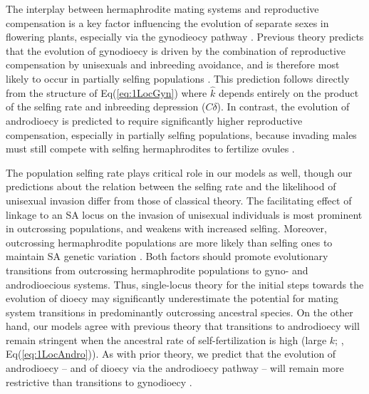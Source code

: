 \documentclass{article}
\begin{document}
The interplay between hermaphrodite mating systems and reproductive compensation is a key factor influencing the evolution of separate sexes in flowering plants, especially via the gynodieocy pathway \citep{Darwin1877,Charlesworth1978a}. Previous theory predicts that the evolution of gynodioecy is driven by the combination of reproductive compensation by unisexuals and inbreeding avoidance, and is therefore most likely to occur in partially selfing populations \citep{Lewis1942,Lloyd1975,Charlesworth1978a,KaferPannell2017}. This prediction follows directly from the structure of Eq(\ref{eq:1LocGyn}) where $\hat{k}$ depends entirely on the product of the selfing rate and inbreeding depression ($C \delta$). In contrast, the evolution of androdioecy is predicted to require significantly higher reproductive compensation, especially in partially selfing populations, because invading males must still compete with selfing hermaphrodites to fertilize ovules \citep{Charlesworth1978b, KaferPannell2017}. 

The population selfing rate plays critical role in our models as well, though our predictions about the relation between the selfing rate and the likelihood of unisexual invasion differ from those of classical theory. The facilitating effect of linkage to an SA locus on the invasion of unisexual individuals is most prominent in outcrossing populations, and weakens with increased selfing. Moreover, outcrossing hermaphrodite populations are more likely than selfing ones to maintain SA genetic variation \citep{JordanConnallon2014,Olito2016}. Both factors should promote evolutionary transitions from outcrossing hermaphrodite populations to gyno- and androdioecious systems. Thus, single-locus theory for the initial steps towards the evolution of dioecy may significantly underestimate the potential for mating system transitions in predominantly outcrossing ancestral species. On the other hand, our models agree with previous theory that transitions to androdioecy will remain stringent when the ancestral rate of self-fertilization is high (large $k$; \citealt{Charlesworth1978a}, Eq(\ref{eq:1LocAndro})). As with prior theory, we predict that the evolution of androdioecy -- and of dioecy via the androdioecy pathway -- will remain more restrictive than transitions to gynodioecy \citep{Charlesworth1978a, Charlesworth2006, KaferPannell2017, Renner2014}.
\end{document}
